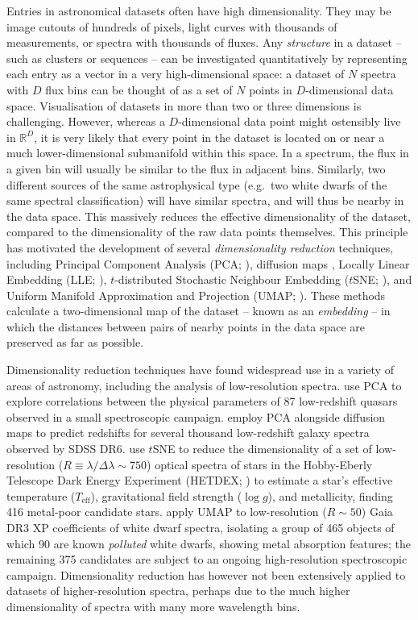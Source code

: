\documentclass[fleqn,usenatbib]{mnras}
\def\Teff{T_\mathrm{eff}}
\begin{document}
Entries in astronomical datasets often have high dimensionality.
They may be image cutouts of hundreds of pixels, light curves with thousands of measurements, or spectra with thousands of fluxes.
Any \textit{structure} in a dataset -- such as clusters or sequences -- can be investigated quantitatively by representing each entry as a vector in a very high-dimensional space: a dataset of $N$ spectra with $D$ flux bins can be thought of as a set of $N$ points in $D$-dimensional data space.
Visualisation of datasets in more than two or three dimensions is challenging.
However, whereas a $D$-dimensional data point might ostensibly live in $\mathbb{R}^D$, it is very likely that every point in the dataset is located on or near a much lower-dimensional submanifold within this space.
In a spectrum, the flux in a given bin will usually be similar to the flux in adjacent bins.
Similarly, two different sources of the same astrophysical type (e.g.\ two white dwarfs of the same spectral classification) will have similar spectra, and will thus be nearby in the data space.
This massively reduces the effective dimensionality of the dataset, compared to the dimensionality of the raw data points themselves.
This principle has motivated the development of several \textit{dimensionality reduction} techniques, including Principal Component Analysis (PCA; \citealt{pca}), diffusion maps \citep{coifman06, lafon06}, Locally Linear Embedding (LLE; \citealt{roweis00}), $t$-distributed Stochastic Neighbour Embedding ($t$SNE; \citealt{tsne}), and Uniform Manifold Approximation and Projection (UMAP; \citealt{umap}).
These methods calculate a two-dimensional map of the dataset -- known as an \textit{embedding} -- in which the distances between pairs of nearby points in the data space are preserved as far as possible.

Dimensionality reduction techniques have found widespread use in a variety of areas of astronomy, including the analysis of low-resolution spectra.
\citet{boroson92} use PCA to explore correlations between the physical parameters of 87 low-redshift quasars observed in a small spectroscopic campaign.
\citet{richards09} employ PCA alongside diffusion maps to predict redshifts for several thousand low-redshift galaxy spectra observed by SDSS DR6.
\citet{hawkins21} use $t$SNE to reduce the dimensionality of a set of low-resolution ($R\equiv \lambda / \Delta \lambda \sim750$) optical spectra of stars in the Hobby-Eberly Telescope Dark Energy Experiment (HETDEX; \citealt{gebhardt21}) to estimate a star's effective temperature ($\Teff$), gravitational field strength ($\log g$), and metallicity, finding 416 metal-poor candidate stars.
\citet{kao24} apply UMAP to low-resolution ($R\sim50$) Gaia DR3 XP coefficients of white dwarf spectra, isolating a group of 465 objects of which 90 are known \textit{polluted} white dwarfs, showing metal absorption features; the remaining 375 candidates are subject to an ongoing high-resolution spectroscopic campaign.
Dimensionality reduction has however not been extensively applied to datasets of higher-resolution spectra, perhaps due to the much higher dimensionality of spectra with many more wavelength bins.
\end{document}
